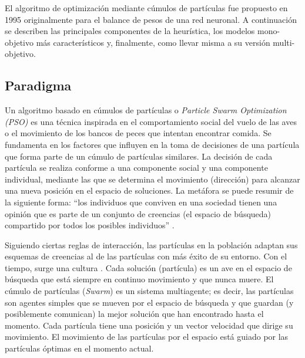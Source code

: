   El algoritmo de optimizaci\'on mediante c\'umulos de part\'iculas \DIFaddbegin {}\DIFaddend fue propuesto en 1995 \DIFdelbegin {}\DIFdelend \DIFaddbegin {}\DIFaddend originalmente
  para el balance de pesos de una red neuronal. A continuaci\'on se describen las principales componentes de la heur\'istica, 
  los modelos mono-objetivo m\'as caracter\'isticos y, finalmente, como llevar \DIFdelbegin %
\DIFdelend \DIFaddbegin {}\DIFaddend misma a su versi\'on multi-objetivo.

  \subsection{Paradigma}

  Un algoritmo basado en c\'umulos de part\'iculas o \textit{Particle Swarm Optimization (PSO)} es una t\'ecnica inspirada en el 
  comportamiento social del vuelo de las aves o el movimiento de los bancos de peces que intentan encontrar comida. Se fundamenta 
  en los factores que influyen en la toma de decisiones de una part\'icula que forma parte de un c\'umulo de part\'iculas similares. 
  La decisi\'on de cada part\'icula se realiza conforme a una componente social y una componente individual, mediante las que se 
  determina el movimiento (direcci\'on) para alcanzar una nueva posici\'on en el espacio de soluciones. La met\'afora se puede resumir 
  de la siguiente forma: ``los individuos que conviven en una sociedad tienen una opini\'on que es parte de un conjunto de creencias 
  (el espacio de b\'usqueda) compartido por todos los posibles individuos'' \cite{JKennedySI}. 

  Siguiendo ciertas reglas de interacci\'on, las part\'iculas en la poblaci\'on adaptan sus esquemas de creencias al de las part\'iculas 
  con m\'as \'exito de su entorno. Con el tiempo, surge una cultura \DIFdelbegin {}\DIFdelend \DIFaddbegin {}\DIFaddend . Cada soluci\'on (part\'icula) es un ave en el espacio de b\'usqueda que est\'a 
  siempre en continuo movimiento y que nunca muere. El c\'umulo de part\'iculas (\textit{Swarm}) es un sistema multiagente; es decir, 
  las part\'iculas son agentes simples que se mueven por el espacio de b\'usqueda y que guardan (y posiblemente comunican) la mejor soluci\'on 
  que han encontrado hasta el momento. Cada part\'icula tiene una posici\'on y un vector velocidad que dirige su movimiento. El movimiento 
  de las part\'iculas por el espacio est\'a guiado por las part\'iculas \'optimas en el momento actual.

